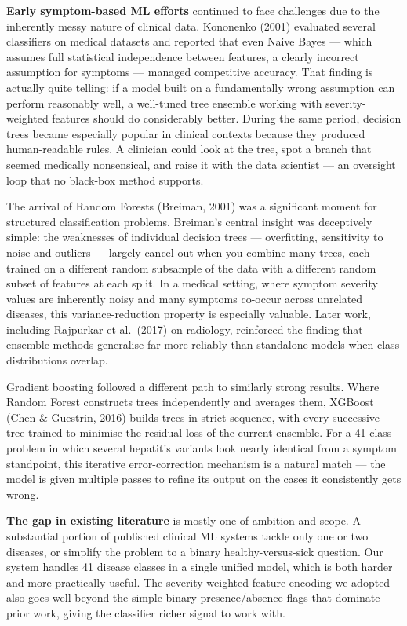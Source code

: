 \documentclass[12pt,a4paper]{article}
\begin{document}
\textbf{Early symptom-based ML efforts} continued to face challenges due to the inherently messy nature of clinical data. Kononenko (2001) evaluated several classifiers on medical datasets and reported that even Naive Bayes --- which assumes full statistical independence between features, a clearly incorrect assumption for symptoms --- managed competitive accuracy. That finding is actually quite telling: if a model built on a fundamentally wrong assumption can perform reasonably well, a well-tuned tree ensemble working with severity-weighted features should do considerably better. During the same period, decision trees became especially popular in clinical contexts because they produced human-readable rules. A clinician could look at the tree, spot a branch that seemed medically nonsensical, and raise it with the data scientist --- an oversight loop that no black-box method supports.

The arrival of Random Forests (Breiman, 2001) was a significant moment for structured classification problems. Breiman's central insight was deceptively simple: the weaknesses of individual decision trees --- overfitting, sensitivity to noise and outliers --- largely cancel out when you combine many trees, each trained on a different random subsample of the data with a different random subset of features at each split. In a medical setting, where symptom severity values are inherently noisy and many symptoms co-occur across unrelated diseases, this variance-reduction property is especially valuable. Later work, including Rajpurkar et al.\ (2017) on radiology, reinforced the finding that ensemble methods generalise far more reliably than standalone models when class distributions overlap.

Gradient boosting followed a different path to similarly strong results. Where Random Forest constructs trees independently and averages them, XGBoost (Chen \& Guestrin, 2016) builds trees in strict sequence, with every successive tree trained to minimise the residual loss of the current ensemble. For a 41-class problem in which several hepatitis variants look nearly identical from a symptom standpoint, this iterative error-correction mechanism is a natural match --- the model is given multiple passes to refine its output on the cases it consistently gets wrong.

\textbf{The gap in existing literature} is mostly one of ambition and scope. A substantial portion of published clinical ML systems tackle only one or two diseases, or simplify the problem to a binary healthy-versus-sick question. Our system handles 41 disease classes in a single unified model, which is both harder and more practically useful. The severity-weighted feature encoding we adopted also goes well beyond the simple binary presence/absence flags that dominate prior work, giving the classifier richer signal to work with.
\end{document}
